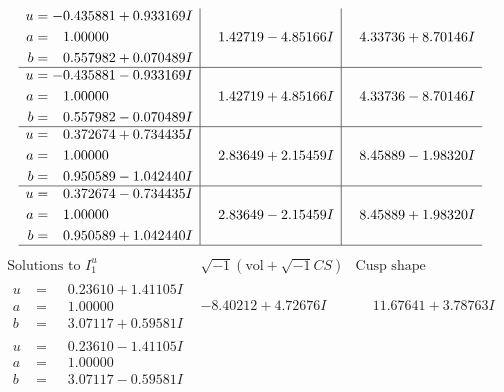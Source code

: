 \documentclass[1p]{elsarticle_modified}
\theoremstyle{definition}
\newcommand{\I}{\sqrt{-1}}
\begin{document}
$$\begin{array}{c|c|c}
\begin{aligned}
u &= -0.435881 + 0.933169 I \\
a &= \phantom{-}1.00000\phantom{ +0.000000I} \\
b &= \phantom{-}0.557982 + 0.070489 I\end{aligned}
 & \phantom{-}1.42719 - 4.85166 I & \phantom{-}4.33736 + 8.70146 I \\ \hline\begin{aligned}
u &= -0.435881 - 0.933169 I \\
a &= \phantom{-}1.00000\phantom{ +0.000000I} \\
b &= \phantom{-}0.557982 - 0.070489 I\end{aligned}
 & \phantom{-}1.42719 + 4.85166 I & \phantom{-}4.33736 - 8.70146 I \\ \hline\begin{aligned}
u &= \phantom{-}0.372674 + 0.734435 I \\
a &= \phantom{-}1.00000\phantom{ +0.000000I} \\
b &= \phantom{-}0.950589 - 1.042440 I\end{aligned}
 & \phantom{-}2.83649 + 2.15459 I & \phantom{-}8.45889 - 1.98320 I \\ \hline\begin{aligned}
u &= \phantom{-}0.372674 - 0.734435 I \\
a &= \phantom{-}1.00000\phantom{ +0.000000I} \\
b &= \phantom{-}0.950589 + 1.042440 I\end{aligned}
 & \phantom{-}2.83649 - 2.15459 I & \phantom{-}8.45889 + 1.98320 I\\
 \hline 
 \end{array}$$\newpage$$\begin{array}{c|c|c}  
\text{Solutions to }I^u_{1}& \I (\text{vol} + \sqrt{-1}CS) & \text{Cusp shape}\\
 \hline 
\begin{aligned}
u &= \phantom{-}0.23610 + 1.41105 I \\
a &= \phantom{-}1.00000\phantom{ +0.000000I} \\
b &= \phantom{-}3.07117 + 0.59581 I\end{aligned}
 & -8.40212 + 4.72676 I & \phantom{-}11.67641 + 3.78763 I \\ \hline\begin{aligned}
u &= \phantom{-}0.23610 - 1.41105 I \\
a &= \phantom{-}1.00000\phantom{ +0.000000I} \\
b &= \phantom{-}3.07117 - 0.59581 I\end{aligned}

\end{array}$$
\end{document}
